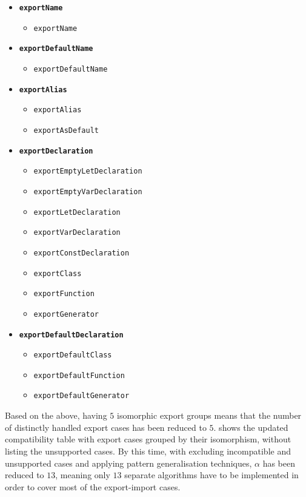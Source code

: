 \begin{itemize}
\item \textbf{\lstinline{exportName}}
	\begin{itemize}
	\item \lstinline{exportName}
	\end{itemize}

\item \textbf{\lstinline{exportDefaultName}}
	\begin{itemize}
	\item \lstinline{exportDefaultName}
	\end{itemize}

\item \textbf{\lstinline{exportAlias}}
	\begin{itemize}
	\item \lstinline{exportAlias}
	\item \lstinline{exportAsDefault}
	\end{itemize}

\item \textbf{\lstinline{exportDeclaration}}
	\begin{itemize}
	\item \lstinline{exportEmptyLetDeclaration}
	\item \lstinline{exportEmptyVarDeclaration}
	\item \lstinline{exportLetDeclaration}
	\item \lstinline{exportVarDeclaration}
	\item \lstinline{exportConstDeclaration}
	\item \lstinline{exportClass}
	\item \lstinline{exportFunction}
	\item \lstinline{exportGenerator}
	\end{itemize}

\item \textbf{\lstinline{exportDefaultDeclaration}}
	\begin{itemize}
	\item \lstinline{exportDefaultClass}
	\item \lstinline{exportDefaultFunction}
	\item \lstinline{exportDefaultGenerator}
	\end{itemize}
\end{itemize}

Based on the above, having $5$ isomorphic export groups means that the number of distinctly handled export cases has been reduced to $5$.  shows the updated compatibility table with export cases grouped by their isomorphism, without listing the unsupported cases. By this time, with excluding incompatible and unsupported cases and applying pattern generalisation techniques, $\alpha$ has been reduced to $13$, meaning only $13$ separate algorithms have to be implemented in order to cover most of the export-import cases.


